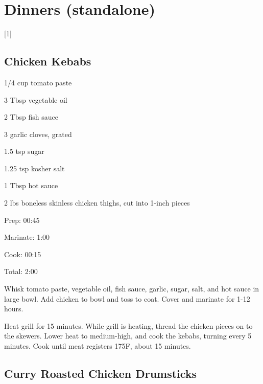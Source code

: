 \documentclass[oneside]{book}  %
\def\thisrecipe{}  %
\newcommand{\chapterrec}[1]{  %
  \newpage \def\thisrecipe{} \chapter{#1} \vspace{1.1em}
}
\newcommand{\chaptertoc}[1]{  %
  \chapterrec{#1} \vspace{-1.1em}  %
  \startcontents[chapters] \printcontents[chapters]{chapter_toc_}{1}[1]{}
}
\newcommand{\recipe}[1]{\section{#1}\def\thisrecipe{: #1}} %
\newcommand{\degF}{\textdegree F\xspace}
\begin{document}
\chaptertoc{Dinners (standalone)} \label{chap:dinners_standalone}
\recipe{Chicken Kebabs} \label{recipe:chicken_kebabs} %

\begin{IT}[0.813]
  \begin{ingredients}
    \item[1/4 cup] tomato paste
    \item[3 Tbsp] vegetable oil
    \item[2 Tbsp] fish sauce
    \item[3] garlic cloves, grated
    \item[1.5 tsp] sugar
    \item[1.25 tsp] kosher salt
    \item[1 Tbsp] hot sauce
    \item[2 lbs] boneless skinless chicken thighs, cut into 1-inch pieces
  \end{ingredients}

  \switchcolumn

  \begin{timeline}
    \item[Prep:]     00:45
    \item[Marinate:] 1:00
    \item[Cook:]     00:15
    \item[Total:]    2:00
  \end{timeline}
\end{IT}

\begin{directions}
  \item Whisk tomato paste, vegetable oil, fish sauce, garlic, sugar, salt, and
  hot sauce in large bowl. Add chicken to bowl and toss to coat. Cover and
  marinate for 1-12 hours.

  \item Heat grill for 15 minutes. While grill is heating, thread the chicken
  pieces on to the skewers. Lower heat to medium-high, and cook the kebabs,
  turning every 5 minutes. Cook until meat registers 175\degF, about 15 minutes.
\end{directions}
\recipe{Curry Roasted Chicken Drumsticks} \label{recipe:curry_roasted_chicken_drumsticks} %
\end{document}
